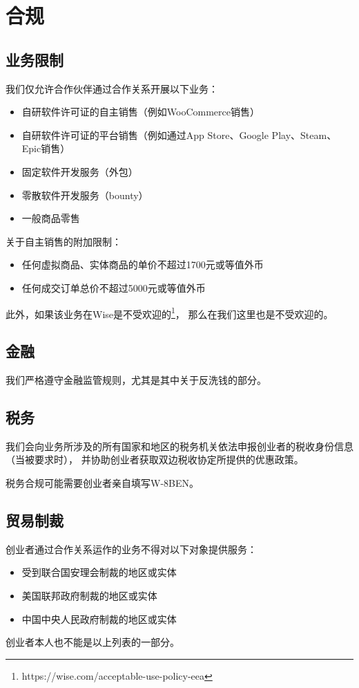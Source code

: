 \documentclass[a4paper,12pt]{report}
\begin{document}
\chapter{合规}
\section{业务限制}
我们仅允许合作伙伴通过合作关系开展以下业务：

\begin{itemize}
	\item 自研软件许可证的自主销售（例如WooCommerce销售）
	\item 自研软件许可证的平台销售（例如通过App Store、Google Play、Steam、Epic销售）
	\item 固定软件开发服务（外包）
	\item 零散软件开发服务（bounty）
	\item 一般商品零售
\end{itemize}

关于自主销售的附加限制：

\begin{itemize}
	\item 任何虚拟商品、实体商品的单价不超过1700元或等值外币
	\item 任何成交订单总价不超过5000元或等值外币
\end{itemize}

此外，如果该业务在Wise是不受欢迎的\footnote{https://wise.com/acceptable-use-policy-eea}，
那么在我们这里也是不受欢迎的。

\section{金融}
我们严格遵守金融监管规则，尤其是其中关于反洗钱的部分。

\section{税务}
我们会向业务所涉及的所有国家和地区的税务机关依法申报创业者的税收身份信息（当被要求时），
并协助创业者获取双边税收协定所提供的优惠政策。

税务合规可能需要创业者亲自填写W-8BEN。

\section{贸易制裁}
创业者通过合作关系运作的业务不得对以下对象提供服务：

\begin{itemize}
	\item 受到联合国安理会制裁的地区或实体
	\item 美国联邦政府制裁的地区或实体
	\item 中国中央人民政府制裁的地区或实体
\end{itemize}

创业者本人也不能是以上列表的一部分。
\end{document}
